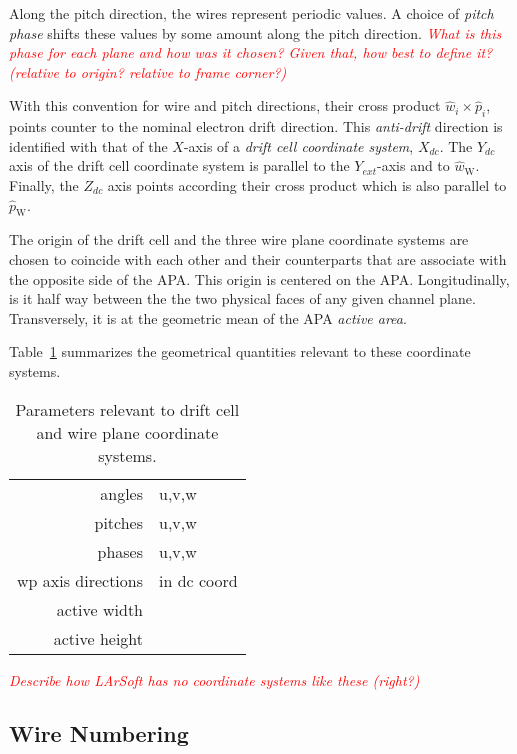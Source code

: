 \documentclass[letterpaper,twoside,onecolumn,article]{memoir}
\newcommand{\fixme}[1]{\textcolor{red}{\textit{#1}}}
\begin{document}
Along the pitch direction, the wires represent periodic values.  A
choice of \textit{pitch phase} shifts these values by some amount
along the pitch direction.  \fixme{What is this phase for each plane
  and how was it chosen?  Given that, how best to define it? (relative
  to origin?  relative to frame corner?)}

With this convention for wire and pitch directions, their cross
product $\hat{w}_i \times \hat{p}_i$, points counter to the nominal
electron drift direction.  This \textit{anti-drift} direction is
identified with that of the $X$-axis of a \textit{drift cell
  coordinate system}, $X_{dc}$.  The $Y_{dc}$ axis of the drift cell
coordinate system is parallel to the $Y_{ext}$-axis and to
$\hat{w}_{\mbox{W}}$.  Finally, the $Z_{dc}$ axis points according
their cross product which is also parallel to $\hat{p}_{\mbox{W}}$.

The origin of the drift cell and the three wire plane coordinate
systems are chosen to coincide with each other and their counterparts
that are associate with the opposite side of the APA.  This origin is
centered on the APA.  Longitudinally, is it half way between the the
two physical faces of any given channel plane.  Transversely, it is at
the geometric mean of the APA \textit{active area}.

Table~\ref{tab:wire-drift-coord-params} summarizes the geometrical
quantities relevant to these coordinate systems.


\begin{table}[h]
  \centering
  \begin{tabularx}{1.0\linewidth}[h]{|r|l|}
    angles & u,v,w \\
    pitches & u,v,w \\
    phases & u,v,w \\
    wp axis directions & in dc coord \\
    active width & \\
    active height & \\
  \end{tabularx}
  \caption{Parameters relevant to drift cell and wire plane coordinate systems.}
  \label{tab:wire-drift-coord-params}
\end{table}

\fixme{Describe how LArSoft has no coordinate systems like these (right?)}

\subsection{Wire Numbering}
\end{document}
